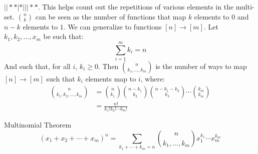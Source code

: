 \documentclass[crop=false,class=book,oneside]{standalone}
\begin{document}
        $||**|*|||**$. This helps count out the repetitions of various elements
        in the multi-set. $\binom{n}{k}$ can be seen as the number of
        functions that map $k$ elements to $0$ and $n-k$ elements to $1$.
        We can generalize to functions $[n]\rightarrow[m]$. Let
        $k_{1},k_{2},\dots,x_{m}$ be such that:
        \begin{equation}
            \sum_{i=1}^{m}k_{i}=n
        \end{equation}
        And such that, for all $i$, $k_{i}\geq{0}$. Then
        $\binom{n}{k_{1},\dots,k_{m}}$ is the number of ways to map
        $[n]\rightarrow[m]$ such that $k_{i}$ elements map to $i$, where:
        \begin{align}
            \binom{n}{k_{1},k_{2},\dots,k_{m}}&=
            \binom{n}{k_{1}}\binom{n-k_{1}}{k_{2}}
            \binom{n-k_{1}-k_{2}}{k_{3}}\cdots\binom{k_{m}}{k_{m}}\\
            &=\frac{n!}{k_{1}!k_{2}!\cdots{k}_{m}!}
        \end{align}
        \begin{ltheorem}{Multinomial Theorem}
            \begin{equation}
                (x_{1}+x_{2}+\cdots+x_{m})^{n}=
                \sum_{k_{1}+\cdots+k_{m}=n}
                \binom{n}{k_{1},\dots,k_{m}}x_{1}^{k_{1}}\cdots{x}_{m}^{k_{m}}
            \end{equation}
        \end{ltheorem}
\end{document}
